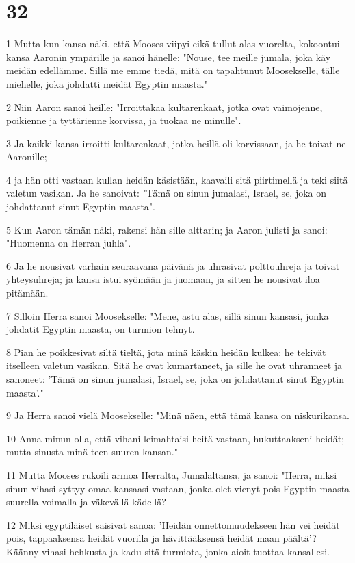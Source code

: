 \chapter{32}

\par 1 Mutta kun kansa näki, että Mooses viipyi eikä tullut alas vuorelta, kokoontui kansa Aaronin ympärille ja sanoi hänelle: "Nouse, tee meille jumala, joka käy meidän edellämme. Sillä me emme tiedä, mitä on tapahtunut Moosekselle, tälle miehelle, joka johdatti meidät Egyptin maasta."
\par 2 Niin Aaron sanoi heille: "Irroittakaa kultarenkaat, jotka ovat vaimojenne, poikienne ja tyttärienne korvissa, ja tuokaa ne minulle".
\par 3 Ja kaikki kansa irroitti kultarenkaat, jotka heillä oli korvissaan, ja he toivat ne Aaronille;
\par 4 ja hän otti vastaan kullan heidän käsistään, kaavaili sitä piirtimellä ja teki siitä valetun vasikan. Ja he sanoivat: "Tämä on sinun jumalasi, Israel, se, joka on johdattanut sinut Egyptin maasta".
\par 5 Kun Aaron tämän näki, rakensi hän sille alttarin; ja Aaron julisti ja sanoi: "Huomenna on Herran juhla".
\par 6 Ja he nousivat varhain seuraavana päivänä ja uhrasivat polttouhreja ja toivat yhteysuhreja; ja kansa istui syömään ja juomaan, ja sitten he nousivat iloa pitämään.
\par 7 Silloin Herra sanoi Moosekselle: "Mene, astu alas, sillä sinun kansasi, jonka johdatit Egyptin maasta, on turmion tehnyt.
\par 8 Pian he poikkesivat siltä tieltä, jota minä käskin heidän kulkea; he tekivät itselleen valetun vasikan. Sitä he ovat kumartaneet, ja sille he ovat uhranneet ja sanoneet: 'Tämä on sinun jumalasi, Israel, se, joka on johdattanut sinut Egyptin maasta'."
\par 9 Ja Herra sanoi vielä Moosekselle: "Minä näen, että tämä kansa on niskurikansa.
\par 10 Anna minun olla, että vihani leimahtaisi heitä vastaan, hukuttaakseni heidät; mutta sinusta minä teen suuren kansan."
\par 11 Mutta Mooses rukoili armoa Herralta, Jumalaltansa, ja sanoi: "Herra, miksi sinun vihasi syttyy omaa kansaasi vastaan, jonka olet vienyt pois Egyptin maasta suurella voimalla ja väkevällä kädellä?
\par 12 Miksi egyptiläiset saisivat sanoa: 'Heidän onnettomuudekseen hän vei heidät pois, tappaaksensa heidät vuorilla ja hävittääksensä heidät maan päältä'? Käänny vihasi hehkusta ja kadu sitä turmiota, jonka aioit tuottaa kansallesi.
